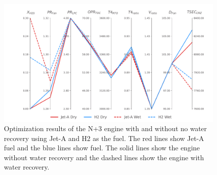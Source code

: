 \documentclass[conf]{new-aiaa}
\begin{document}
\begin{figure}[hbt!]
  \centering
  \includegraphics[width=1.0\textwidth]{N3_parallel_coords.pdf}
  \caption{Optimization results of the N+3 engine with and without no water recovery using Jet-A and H2 as the fuel.
    The red lines show Jet-A fuel and the blue lines show  fuel.
    The solid lines show the engine without water recovery and the dashed lines show the engine with water recovery.}
  \label{fig:parallel_coords}
\end{figure}
\end{document}
